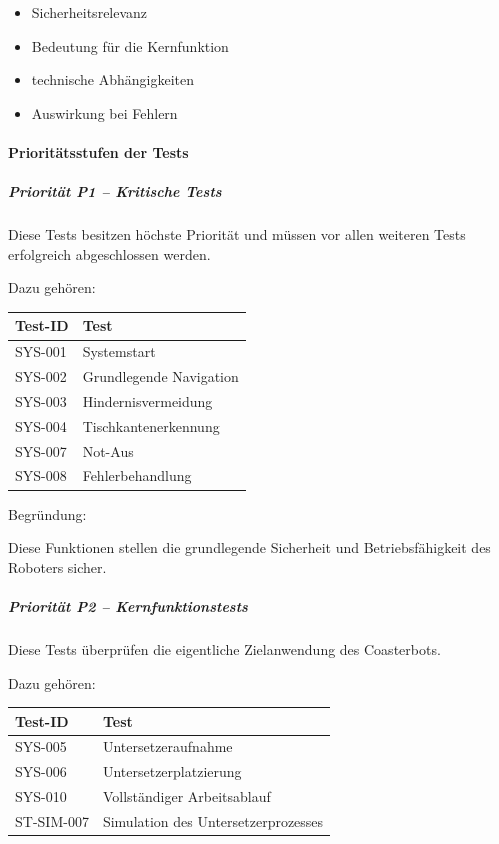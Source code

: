 \documentclass[
  a4paper,
  12pt,
  DIV=12,        %
  parskip=half,  %
  headings=small %
]{scrartcl}
\theoremstyle{definition}
\providecommand{\tightlist}{%
  \setlength{\itemsep}{0pt}\setlength{\parskip}{0pt}}
\theoremstyle{definition}
\begin{document}
\begin{itemize}
\tightlist
\item
  Sicherheitsrelevanz
\item
  Bedeutung für die Kernfunktion
\item
  technische Abhängigkeiten
\item
  Auswirkung bei Fehlern
\end{itemize}

\paragraph{Prioritätsstufen der
Tests}\label{priorituxe4tsstufen-der-tests}

\subparagraph{Priorität P1 -- Kritische
Tests}\label{priorituxe4t-p1-kritische-tests-1}

Diese Tests besitzen höchste Priorität und müssen vor allen weiteren
Tests erfolgreich abgeschlossen werden.

Dazu gehören:

\begin{longtable}[]{@{}ll@{}}
\toprule\noalign{}
Test-ID & Test \\
\midrule\noalign{}
\endhead
\bottomrule\noalign{}
\endlastfoot
SYS-001 & Systemstart \\
SYS-002 & Grundlegende Navigation \\
SYS-003 & Hindernisvermeidung \\
SYS-004 & Tischkantenerkennung \\
SYS-007 & Not-Aus \\
SYS-008 & Fehlerbehandlung \\
\end{longtable}

Begründung:

Diese Funktionen stellen die grundlegende Sicherheit und
Betriebsfähigkeit des Roboters sicher.

\subparagraph{Priorität P2 --
Kernfunktionstests}\label{priorituxe4t-p2-kernfunktionstests}

Diese Tests überprüfen die eigentliche Zielanwendung des Coasterbots.

Dazu gehören:

\begin{longtable}[]{@{}ll@{}}
\toprule\noalign{}
Test-ID & Test \\
\midrule\noalign{}
\endhead
\bottomrule\noalign{}
\endlastfoot
SYS-005 & Untersetzeraufnahme \\
SYS-006 & Untersetzerplatzierung \\
SYS-010 & Vollständiger Arbeitsablauf \\
ST-SIM-007 & Simulation des Untersetzerprozesses \\
\end{longtable}
\end{document}
